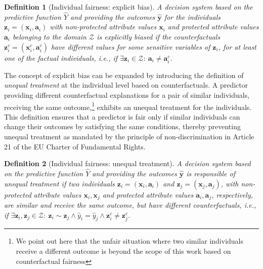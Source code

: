 \documentclass[letterpaper]{article} %
\newtheorem{definition}{Definition}
\begin{document}
\begin{definition}[Individual fairness: explicit bias]\label{explicit_bias}
	A decision system based on the predictive function $\hat{Y}$ and providing the outcomes $\boldsymbol{\hat{y}}$ for the individuals $\boldsymbol{z}_i = (\boldsymbol{x}_i, \boldsymbol{a}_i)$ with non-protected attribute values $\boldsymbol{x}_{i}$ and protected attribute values $\boldsymbol{a}_{i}$ belonging to the domain $\mathcal{Z}$ is \emph{explicitly biased} if the counterfactuals $\boldsymbol{z}_i^c = (\boldsymbol{x}_i^c, \boldsymbol{a}_i^c)$ have different values for some sensitive variables of $\boldsymbol{z}_i$, for at least one of the factual individuals, i.e., if $\exists \boldsymbol{z}_i \in \mathcal{Z} : ~ \boldsymbol{a}_{i} \neq \boldsymbol{a}_{i}^{c}$.
\end{definition}

The concept of explicit bias can be expanded by introducing the definition of \emph{unequal treatment} at the individual level based on counterfactuals.
%
A predictor providing different counterfactual explanations for a pair of similar individuals, receiving the same outcome,\footnote{We point out here that the unfair situation where two similar individuals receive a different outcome is beyond the scope of this work based on counterfactual fairness} exhibits an unequal treatment for the individuals.
%
This definition ensures that a predictor is fair only if similar individuals can change their outcomes by satisfying the same conditions, thereby preventing unequal treatment as mandated by the principle of non-discrimination in Article 21 of the EU Charter of Fundamental Rights.

\begin{definition}[Individual fairness: unequal treatment]\label{unequal_treatment}
	A decision system based on the predictive function $\hat{Y}$ and providing the outcomes $\boldsymbol{\hat{y}}$ is responsible of \emph{unequal treatment} if two individuals $\boldsymbol{z}_i = (\boldsymbol{x}_i, \boldsymbol{a}_i)$ and $\boldsymbol{z}_j = (\boldsymbol{x}_j, \boldsymbol{a}_j)$, with non-protected attribute values $\boldsymbol{x}_i, \boldsymbol{x}_j$ and protected attribute values $\boldsymbol{a}_i, \boldsymbol{a}_j$, respectively, are similar and receive the same outcome, but have different counterfactuals, i.e., if $\exists \boldsymbol{z}_i, \boldsymbol{z}_j \in \mathcal{Z} : ~ \boldsymbol{z}_i \sim \boldsymbol{z}_j \wedge \hat{y}_i = \hat{y}_j \wedge \boldsymbol{z}_i^c \neq \boldsymbol{z}_j^c$.
\end{definition}
\end{document}
